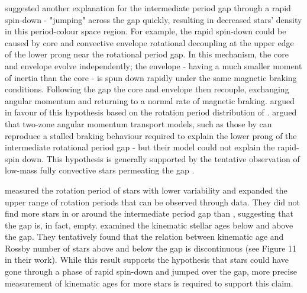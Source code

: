 \citep{mcquillan_rotation_2014} suggested another explanation for the intermediate period gap through a rapid spin-down - "jumping" across the gap quickly, resulting in decreased stars' density in this period-colour space region.
For example, the rapid spin-down could be caused by core and convective envelope rotational decoupling at the upper edge of the lower prong near the rotational period gap.
In this mechanism, the core and envelope evolve independently; the envelope - having a much smaller moment of inertia than the core - is spun down rapidly under the same magnetic braking conditions.
Following the gap the core and envelope then recouple, exchanging angular momentum and returning to a normal rate of magnetic braking. 
\citet{gordon_stellar_2021} argued in favour of this hypothesis based on the rotation period distribution of \ktoo{}. 
\citet{curtis_when_2020} argued that two-zone angular momentum transport models, such as those by \citet{spada_competing_2020} can reproduce a stalled braking behaviour required to explain the lower prong of the intermediate rotational period gap - but their model could not explain the rapid-spin down.
This hypothesis is generally supported by the tentative observation of low-mass fully convective stars permeating the gap \citep{lu_bridging_2022}.

\citet{santos_surface_2021} measured the rotation period of stars with lower variability and expanded the upper range of rotation periods that can be observed through \kepler{} data.
They did not find more stars in or around the intermediate period gap than \citet{mcquillan_rotation_2014}, suggesting that the gap is, in fact, empty.
\citet{lu_bridging_2022} examined the kinematic stellar ages below and above the gap.
They tentatively found that the relation between kinematic age and Rossby number of stars above and below the gap is discontinuous (see Figure 11 in their work).
While this result supports the hypothesis that stars could have gone through a phase of rapid spin-down and jumped over the gap, more precise measurement of kinematic ages for more stars is required to support this claim.

